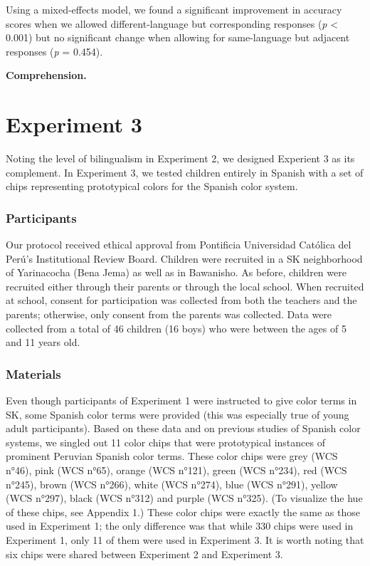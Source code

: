 \documentclass[floatsintext,man]{apa6}
\theoremstyle{definition}
\theoremstyle{definition}
\theoremstyle{definition}
\theoremstyle{remark}
\begin{document}
Using a mixed-effects model, we found a significant improvement in
accuracy scores when we allowed different-language but corresponding
responses (\emph{p} \textless{} 0.001) but no significant change when
allowing for same-language but adjacent responses (\emph{p} = 0.454).

\textbf{Comprehension.}

\section{Experiment 3}\label{experiment-3}

Noting the level of bilingualism in Experiment 2, we designed Experient
3 as its complement. In Experiment 3, we tested children entirely in
Spanish with a set of chips representing prototypical colors for the
Spanish color system.

\subsubsection{Participants}\label{participants-2}

Our protocol received ethical approval from Pontificia Universidad
Católica del Perú's Institutional Review Board. Children were recruited
in a SK neighborhood of Yarinacocha (Bena Jema) as well as in Bawanisho.
As before, children were recruited either through their parents or
through the local school. When recruited at school, consent for
participation was collected from both the teachers and the parents;
otherwise, only consent from the parents was collected. Data were
collected from a total of 46 children (16 boys) who were between the
ages of 5 and 11 years old.

\subsubsection{Materials}\label{materials-2}

Even though participants of Experiment 1 were instructed to give color
terms in SK, some Spanish color terms were provided (this was especially
true of young adult participants). Based on these data and on previous
studies of Spanish color systems, we singled out 11 color chips that
were prototypical instances of prominent Peruvian Spanish color terms.
These color chips were grey (WCS n°46), pink (WCS n°65), orange (WCS
n°121), green (WCS n°234), red (WCS n°245), brown (WCS n°266), white
(WCS n°274), blue (WCS n°291), yellow (WCS n°297), black (WCS n°312) and
purple (WCS n°325). (To visualize the hue of these chips, see Appendix
1.) These color chips were exactly the same as those used in Experiment
1; the only difference was that while 330 chips were used in Experiment
1, only 11 of them were used in Experiment 3. It is worth noting that
six chips were shared between Experiment 2 and Experiment 3.
\end{document}
